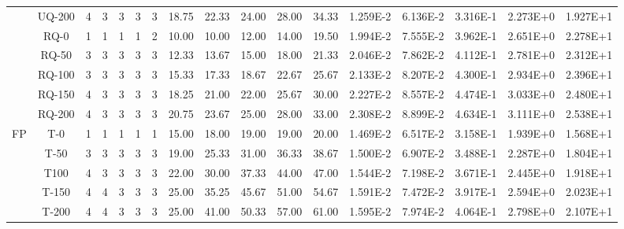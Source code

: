 \begin{table}[ht]
\begin{center}
{\begin{tabular}{cc|c|c|c|c|c|c|c|c|c|c|c|c|c|c|c|}
\multicolumn{1}{|c|}{}                      & \multicolumn{1}{|c|}{UQ-200} &	4	&	3	&	3	&	3	&	3	&	18.75	&	22.33	&	24.00	&	28.00	&	34.33	&	1.259E-2	&	6.136E-2	&	3.316E-1	&	2.273E+0	&	1.927E+1	\\
\cline{2-17}																														
\multicolumn{1}{|c|}{}                      & \multicolumn{1}{|c|}{RQ-0} &	1	&	1	&	1	&	1	&	2	&	10.00	&	10.00	&	12.00	&	14.00	&	19.50	&	1.994E-2	&	7.555E-2	&	3.962E-1	&	2.651E+0	&	2.278E+1	\\
\multicolumn{1}{|c|}{}                      & \multicolumn{1}{|c|}{RQ-50} & 	3	&	3	&	3	&	3	&	3	&	12.33	&	13.67	&	15.00	&	18.00	&	21.33	&	2.046E-2	&	7.862E-2	&	4.112E-1	&	2.781E+0	&	2.312E+1	\\
\multicolumn{1}{|c|}{}                      & \multicolumn{1}{|c|}{RQ-100} &	3	&	3	&	3	&	3	&	3	&	15.33	&	17.33	&	18.67	&	22.67	&	25.67	&	2.133E-2	&	8.207E-2	&	4.300E-1	&	2.934E+0	&	2.396E+1	\\
\multicolumn{1}{|c|}{}                      & \multicolumn{1}{|c|}{RQ-150} &	4	&	3	&	3	&	3	&	3	&	18.25	&	21.00	&	22.00	&	25.67	&	30.00	&	2.227E-2	&	8.557E-2	&	4.474E-1	&	3.033E+0	&	2.480E+1	\\
\multicolumn{1}{|c|}{}                      & \multicolumn{1}{|c|}{RQ-200} & 	4	&	3	&	3	&	3	&	3	&	20.75	&	23.67	&	25.00	&	28.00	&	33.00	&	2.308E-2	&	8.899E-2	&	4.634E-1	&	3.111E+0	&	2.538E+1	\\
\cline{1-17}																														
\multicolumn{1}{|c|}{\multirow{15}{*}{FP}} & \multicolumn{1}{|c|}{T-0} & 	1	&	1	&	1	&	1	&	1	&	15.00	&	18.00	&	19.00	&	19.00	&	20.00	&	1.469E-2	&	6.517E-2	&	3.158E-1	&	1.939E+0	&	1.568E+1	\\
\multicolumn{1}{|c|}{}                      & \multicolumn{1}{|c|}{T-50} & 	3	&	3	&	3	&	3	&	3	&	19.00	&	25.33	&	31.00	&	36.33	&	38.67	&	1.500E-2	&	6.907E-2	&	3.488E-1	&	2.287E+0	&	1.804E+1	\\
\multicolumn{1}{|c|}{}                      & \multicolumn{1}{|c|}{T100} &	4	&	3	&	3	&	3	&	3	&	22.00	&	30.00	&	37.33	&	44.00	&	47.00	&	1.544E-2	&	7.198E-2	&	3.671E-1	&	2.445E+0	&	1.918E+1	\\
\multicolumn{1}{|c|}{}                      & \multicolumn{1}{|c|}{T-150} &	4	&	4	&	3	&	3	&	3	&	25.00	&	35.25	&	45.67	&	51.00	&	54.67	&	1.591E-2	&	7.472E-2	&	3.917E-1	&	2.594E+0	&	2.023E+1	\\
\multicolumn{1}{|c|}{}                      & \multicolumn{1}{|c|}{T-200} &	4	&	4	&	3	&	3	&	3	&	25.00	&	41.00	&	50.33	&	57.00	&	61.00	&	1.595E-2	&	7.974E-2	&	4.064E-1	&	2.798E+0	&	2.107E+1	\\

\end{tabular}}
\end{center}
\end{table}
